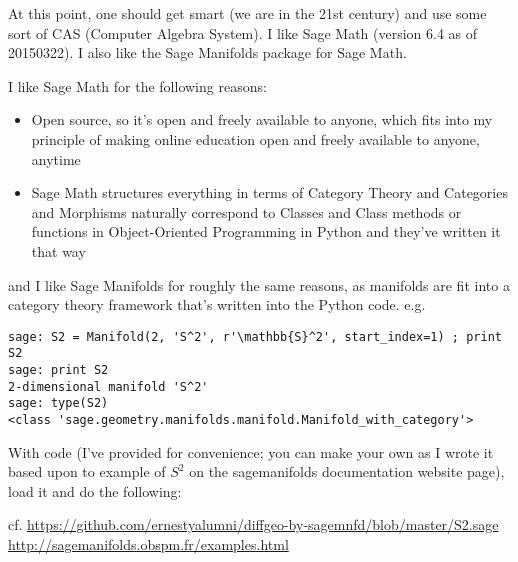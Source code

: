 \documentclass[10pt, twoside]{amsart}
\begin{document}
\begin{multicols*}{2}
At this point, one should get smart (we are in the 21st century) and use some sort of CAS (Computer Algebra System). I like Sage Math (version 6.4 as of 20150322).  I also like the Sage Manifolds package for Sage Math.  

I like Sage Math for the following reasons:
\begin{itemize}
\item Open source, so it’s open and freely available to anyone, which fits into my principle of making online education open and freely available to anyone, anytime
\item Sage Math structures everything in terms of Category Theory and Categories and Morphisms naturally correspond to Classes and Class methods or functions in Object-Oriented Programming in Python and they’ve written it that way
\end{itemize}
and I like Sage Manifolds for roughly the same reasons, as manifolds are fit into a category theory framework that’s written into the Python code.  e.g.

{\small \begin{verbatim}
sage: S2 = Manifold(2, 'S^2', r'\mathbb{S}^2', start_index=1) ; print S2
sage: print S2
2-dimensional manifold 'S^2'
sage: type(S2)
<class 'sage.geometry.manifolds.manifold.Manifold_with_category'>
\end{verbatim}}

With code (I’ve provided for convenience; you can make your own as I wrote it based upon to example of $S^2$ on the sagemanifolds documentation website page), load it and do the following:

cf. \url{https://github.com/ernestyalumni/diffgeo-by-sagemnfd/blob/master/S2.sage} \\
\url{http://sagemanifolds.obspm.fr/examples.html}


\end{multicols*}
\end{document}
